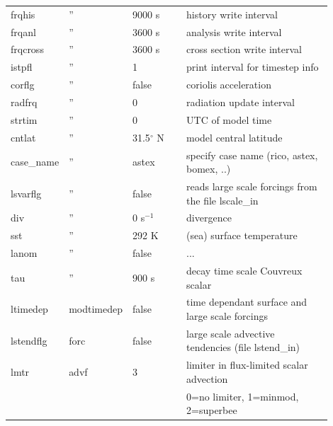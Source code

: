 \documentclass[11pt,a4paper]{article}
\begin{document}
\begin{longtable}[htb]{p{0.12\linewidth}p{0.1\linewidth}p{0.18\linewidth}p{0.5\linewidth}}
frqhis       &  ''  & 9000 s              & history write interval                                \\
frqanl       &  ''  & 3600 s              & analysis write interval                               \\
frqcross     &  ''  & 3600 s              & cross section write interval                          \\
istpfl       &  ''  & 1                   & print interval for timestep info                      \\
corflg       &  ''  & false               & coriolis acceleration                                 \\
radfrq       &  ''  & 0                   & radiation update interval                             \\
strtim       &  ''  & 0                   & UTC of model time                                     \\
cntlat       &  ''  & 31.5$^{\circ}$ N    & model central latitude                                \\
case\_name   &  ''  & astex               & specify case name (rico, astex, bomex, ..)            \\
lsvarflg     &  ''  & false               & reads large scale forcings from the file lscale\_in   \\
div          &  ''  & 0 s$^{-1}$          & divergence                                            \\
sst          &  ''  & 292 K               & (sea) surface temperature                             \\ 
lanom        &  ''  & false               & ...                                                   \\
tau          &  ''  & 900 s               & decay time scale Couvreux scalar                      \\
\hline
ltimedep     & modtimedep & false         & time dependant surface and large scale forcings       \\ 
\hline
lstendflg    & forc & false               & large scale advective tendencies (file lstend\_in)    \\
\hline
lmtr         & advf & 3                   & limiter in flux-limited scalar advection              \\ 
             &      &                     & \hspace{2mm} 0=no limiter, 1=minmod, 2=superbee       \\

\end{longtable}
\end{document}
